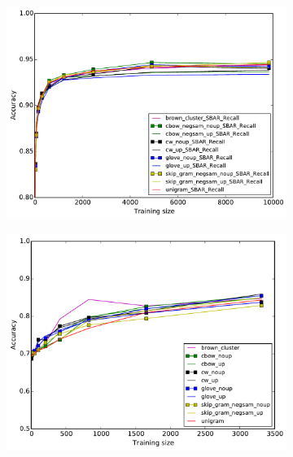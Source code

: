 \begin{figure}[h]
\caption{Chunking and MWE out-of-vocabulary-words accuracy for \textit{in-domain} test set}
\centering
\begin{subfigure}{7cm}
	\centering
    	\includegraphics[scale=.4]{plots/Chunking-OOV}
	\label{fig:inner}
\end{subfigure}
\begin{subfigure}{7cm}
	\centering
    	\includegraphics[scale=0.4]{plots/MWE-OOV}
	\label{fig:outner}
\end{subfigure}  	
\end{figure}	
\fi




